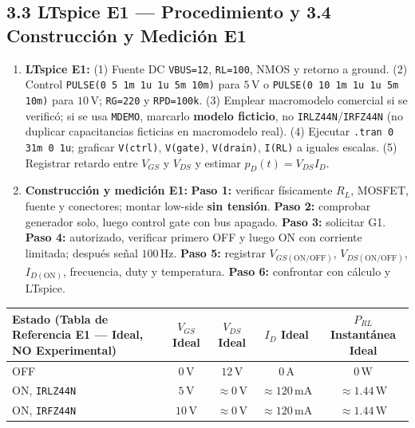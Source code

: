 \documentclass[10pt, a4paper, landscape]{article}
\begin{document}
\subsection*{3.3 LTspice E1 — Procedimiento y 3.4 Construcción y Medición E1}
\begin{enumerate}[noitemsep, topsep=2pt]
    \item \textbf{LTspice E1:} (1) Fuente DC \texttt{VBUS=12}, \texttt{RL=100}, NMOS y retorno a ground. (2) Control \texttt{PULSE(0 5 1m 1u 1u 5m 10m)} para $5\,\text{V}$ o \texttt{PULSE(0 10 1m 1u 1u 5m 10m)} para $10\,\text{V}$; \texttt{RG=220} y \texttt{RPD=100k}. (3) Emplear macromodelo comercial si se verificó; si se usa \texttt{MDEMO}, marcarlo \textbf{modelo ficticio}, no \texttt{IRLZ44N}/\texttt{IRFZ44N} (no duplicar capacitancias ficticias en macromodelo real). (4) Ejecutar \texttt{.tran 0 31m 0 1u}; graficar \texttt{V(ctrl)}, \texttt{V(gate)}, \texttt{V(drain)}, \texttt{I(RL)} a iguales escalas. (5) Registrar retardo entre $V_{GS}$ y $V_{DS}$ y estimar $p_D(t)=V_{DS}I_D$.
    \item \textbf{Construcción y medición E1:} \textbf{Paso 1:} verificar físicamente $R_L$, MOSFET, fuente y conectores; montar low-side \textbf{sin tensión}. \textbf{Paso 2:} comprobar generador solo, luego control gate con bus apagado. \textbf{Paso 3:} solicitar G1. \textbf{Paso 4:} autorizado, verificar primero OFF y luego ON con corriente limitada; después señal $100\,\text{Hz}$. \textbf{Paso 5:} registrar $V_{GS(\text{ON/OFF})}$, $V_{DS(\text{ON/OFF})}$, $I_{D(\text{ON})}$, frecuencia, duty y temperatura. \textbf{Paso 6:} confrontar con cálculo y LTspice.
\end{enumerate}

\par\vspace{0.1cm}\noindent
\renewcommand{\arraystretch}{1.22}
\begin{tabularx}{\linewidth}{|>{\raggedright\arraybackslash}X|c|c|c|c|}
\hline
\rowcolor{ucbgray}
\textbf{Estado (Tabla de Referencia E1 — Ideal, NO Experimental)} & \textbf{$V_{GS}$ Ideal} & \textbf{$V_{DS}$ Ideal} & \textbf{$I_D$ Ideal} & \textbf{$P_{RL}$ Instantánea Ideal} \\ \hline
OFF & $0\,\text{V}$ & $12\,\text{V}$ & $0\,\text{A}$ & $0\,\text{W}$ \\ \hline
ON, \texttt{IRLZ44N} & $5\,\text{V}$ & $\approx 0\,\text{V}$ & $\approx 120\,\text{mA}$ & $\approx 1.44\,\text{W}$ \\ \hline
ON, \texttt{IRFZ44N} & $10\,\text{V}$ & $\approx 0\,\text{V}$ & $\approx 120\,\text{mA}$ & $\approx 1.44\,\text{W}$ \\ \hline
\end{tabularx}
\end{document}
